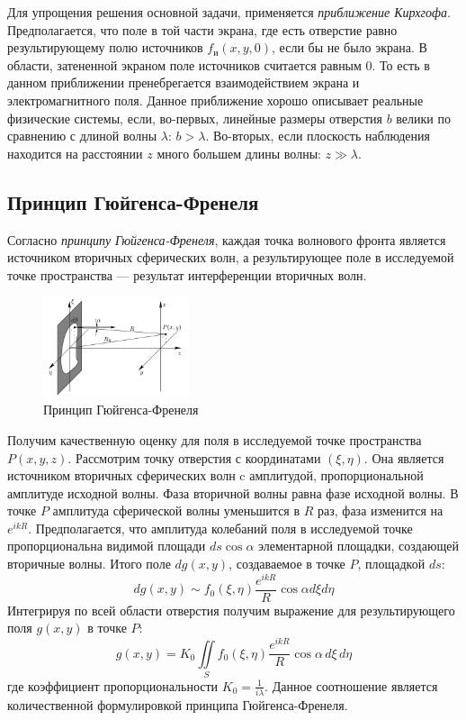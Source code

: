 Для упрощения решения основной задачи, применяется \textit{приближение Кирхгофа}. Предполагается, что поле в той части экрана, где есть отверстие равно результирующему полю источников $f_и(x, y, 0)$, если бы не было экрана. В области, затененной экраном поле источников считается равным 0. То есть в данном приближении пренебрегается взаимодействием экрана и электромагнитного поля. Данное приближение хорошо описывает реальные физические системы, если, во-первых, линейные размеры отверстия $b$ велики по сравнению с длиной волны $\lambda$: $b > \lambda$. Во-вторых, если плоскость наблюдения находится на расстоянии $z$ много большем длины волны: $z \gg \lambda$.

\subsection*{Принцип Гюйгенса-Френеля}

Согласно \textit{принципу Гюйгенса-Френеля}, каждая точка волнового фронта является источником вторичных сферических волн, а результирующее поле в исследуемой точке пространства --- результат интерференции вторичных волн.

\begin{figure}
	\centering
	\includegraphics[width=0.38\textwidth]{../Изображения/Принцип Гюйгенса-Френеля.png}
	\caption{Принцип Гюйгенса-Френеля}
\end{figure}

Получим качественную оценку для поля в исследуемой точке пространства $P(x, y, z)$. Рассмотрим точку отверстия с координатами $(\xi, \eta)$. Она является источником вторичных сферических волн c амплитудой, пропорциональной амплитуде исходной волны. Фаза вторичной волны равна фазе исходной волны. В точке $P$ амплитуда сферической волны уменьшится в $R$ раз, фаза изменится на $e^{ikR}$. Предполагается, что амплитуда колебаний поля в исследуемой точке пропорциональна видимой площади $ds \cos \alpha$ элементарной площадки, создающей вторичные волны. Итого поле $d g(x, y)$, создаваемое в точке $P$, площадкой $ds$:
$$
dg(x, y) \sim f_0(\xi, \eta) \frac{e^{ikR}}{R} \cos \alpha d\xi d\eta
$$
Интегрируя по всей области отверстия получим выражение для результирующего поля $g(x, y)$ в точке $P$:
\begin{equation*}
	g(x, y) = K_0 \iint\limits_S f_0(\xi, \eta) \frac{e^{ikR}}{R} \cos \alpha \, d\xi \, d\eta
	\label{theory:Huygens–Fresnel-prec}
\end{equation*}
где коэффициент пропорциональности $K_0 = \frac{1}{i \lambda}$. Данное соотношение является количественной формулировкой принципа Гюйгенса-Френеля.

